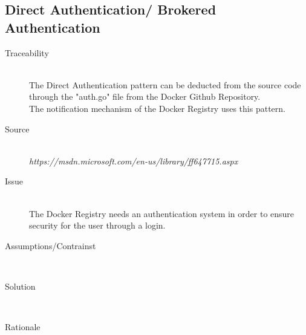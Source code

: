 \subsection{Direct Authentication/ Brokered Authentication}

\begin{description}

\item[Traceability]~\\
The Direct Authentication pattern can be deducted from the source code through the "auth.go" file from the Docker Github Repository. \\
The notification mechanism of the Docker Registry uses this pattern.

\item[Source]~\\
\textit{https://msdn.microsoft.com/en-us/library/ff647715.aspx} \\


\item[Issue]~\\ The Docker Registry needs an authentication system in order to ensure security for the user through a login.

\item[Assumptions/Contrainst]~\\ 

\item[Solution]~\\

\item[Rationale]~\\ 


\end{description}

